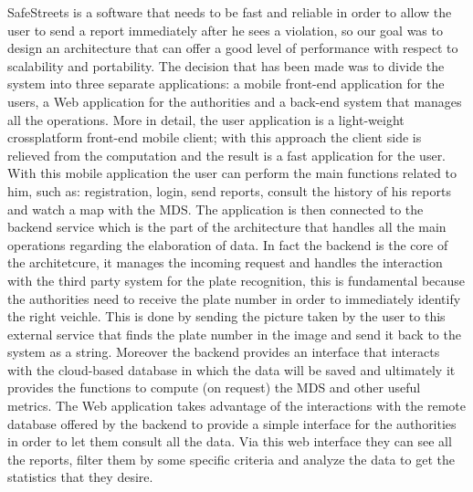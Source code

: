 SafeStreets is a software that needs to be fast and reliable in order to allow the user to send a report immediately after he sees a violation, so our goal was to design an architecture that can offer a good level of performance with respect to scalability and portability. The decision that has been made was to divide the system into three separate applications: a mobile front-end application for the users, a Web application for the authorities and a back-end system that manages all the operations. More in detail, the user application is a light-weight crossplatform front-end mobile client; with this approach the client side is relieved from the computation and the result is a fast application for the user.
With this mobile application the user can perform the main functions related to him, such as: registration, login, send reports, consult the history of his reports and watch a map with the MDS. The application is then connected to the backend service which is the part of the architecture that handles all the main operations regarding the elaboration of data. In fact the backend is the core of the architetcure, it manages the incoming request and handles the interaction with the third party system for the plate recognition, this is fundamental because the authorities need to receive the plate number in order to immediately identify the right veichle. This is done by sending the picture taken by the user to this external service that finds the plate number in the image and send it back to the system as a string. Moreover the backend provides an interface that interacts with the cloud-based database in which the data will be saved and ultimately it provides the functions to compute (on request) the MDS and other useful metrics. The Web application takes advantage of the interactions with the remote database offered by the backend to provide a simple interface for the authorities in order to let them consult all the data. Via this web interface they can see all the reports, filter them by some specific criteria and analyze the data to get the statistics that they desire.



